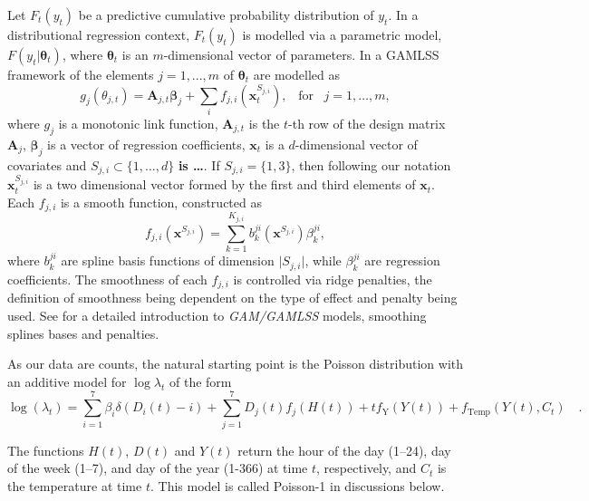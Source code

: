 \documentclass[]{elsarticle} %
\begin{document}
Let \(F_t(y_t)\) be a predictive cumulative probability distribution of
\(y_t\). In a distributional regression context, \(F_t(y_t)\) is modelled
via a parametric model, \(F(y_t|\bm \theta_t)\), where \(\bm \theta_t\) is
an \(m\)-dimensional vector of parameters. In a GAMLSS framework of
\citet{Rigby2005} the elements \(j=1,...,m\) of \(\bm \theta_t\) are modelled as
\begin{equation}
    g_j(\theta_{j,t})=\mathbf{A}_{j,t} \bm{\beta}_j + \sum_{i} f_{j,i}({\bm x}^{S_{j,i}}_t), \;\;\; \text{for} \;\;\; j = 1, \dots, m,
    \label{eq:basicGAM}
\end{equation} where \(g_j\) is a monotonic link function,
\(\mathbf{A}_{j,t}\) is the \(t\)-th row of the design matrix
\(\mathbf{A}_j\), \(\bm \beta_j\) is a vector of regression coefficients,
\(\bm x_t\) is a \(d\)-dimensional vector of covariates and
\(S_{j,i} \subset \{1, \dots, d\}\) \textbf{is \ldots{}}. If \(S_{j,i} = \{1, 3\}\),
then following our notation \({\bm x}_{t}^{S_{j,i}}\) is a two dimensional
vector formed by the first and third elements of \(\bm x_t\). Each
\(f_{j,i}\) is a smooth function, constructed as \begin{equation}
    f_{j,i}(\bm x^{S_{j,i}}) = \sum_{k=1}^{K_{j,i}} b^{ji}_k (\bm x^{S_{j,i}}) \beta_k^{ji},
    \label{eq:smmothfunction}
\end{equation} where \(b^{ji}_k\) are spline basis functions of dimension
\(\vert S_{j,i} \vert\), while \(\beta_k^{ji}\) are regression coefficients.
The smoothness of each \(f_{j,i}\) is controlled via ridge penalties, the
definition of smoothness being dependent on the type of effect and
penalty being used. See \citet{Wood2017} for a detailed introduction to
\emph{GAM/GAMLSS} models, smoothing splines bases and penalties.

As our data are counts, the natural starting point is the Poisson
distribution with an additive model for \(\log \lambda_t\) of the form
\begin{equation}
  \log(\lambda_t) = \sum_{i=1}^7 \beta_i \delta(D_i(t)-i) + \sum_{j=1}^7 D_j(t) f_j(H(t)) + t f_\text{Y}(Y(t)) + f_\text{Temp}(Y(t),C_t) \quad .
 \label{eq:additivemodel}
\end{equation}

The functions \(H(t)\), \(D(t)\) and \(Y(t)\) return the hour of the day
(1--24), day of the week (1--7), and day of the year (1-366) at time
\(t\), respectively, and \(C_t\) is the temperature at time \(t\). This model
is called Poisson-1 in discussions below.
\end{document}
